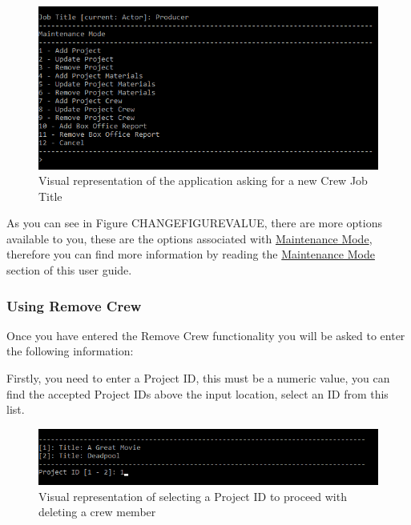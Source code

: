 \documentclass[
  english,
  a4paper,
,tablecaptionabove
]{scrartcl}
\begin{document}
\begin{figure}
\centering
\includegraphics{images/user-guide/maintenance-mode/update-crew-job-title.png}
\caption{Visual representation of the application asking for a new Crew
Job Title}
\end{figure}

As you can see in Figure CHANGEFIGUREVALUE, there are more options
available to you, these are the options associated with
\protect\hyperlink{using-maintenance-mode}{Maintenance Mode}, therefore
you can find more information by reading the
\protect\hyperlink{using-maintenance-mode}{Maintenance Mode} section of
this user guide.

\newpage

\hypertarget{using-remove-crew}{%
\subsubsection{Using Remove Crew}\label{using-remove-crew}}

Once you have entered the Remove Crew functionality you will be asked to
enter the following information:

Firstly, you need to enter a Project ID, this must be a numeric value,
you can find the accepted Project IDs above the input location, select
an ID from this list.

\begin{figure}
\centering
\includegraphics{images/user-guide/maintenance-mode/update-project-select-id.png}
\caption{Visual representation of selecting a Project ID to proceed with
deleting a crew member}
\end{figure}
\end{document}

